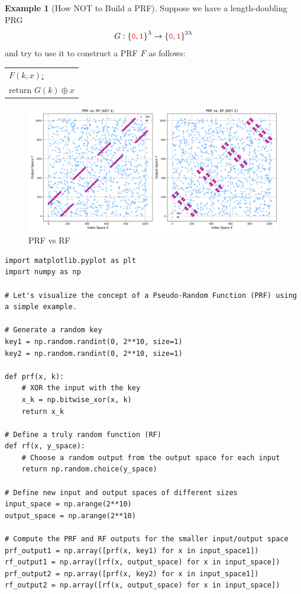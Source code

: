 \documentclass[12pt,openany]{book}
\theoremstyle{definition}
\newtheorem{example}{Example}[chapter]
\newcommand{\zero}{\textcolor{red}{\texttt{0}}}
\newcommand{\one}{\textcolor{red}{\texttt{1}}}
\newcommand{\tab}{\hspace{12pt}}
\newcommand{\xor}{\oplus}
\newcommand{\binaryfield}{\set{\zero,\one}}
\begin{document}
\begin{example}[How NOT to Build a PRF]
	Suppose we have a length-doubling PRG \[
	G:\binaryfield^{\lambda}\to\binaryfield^{2\lambda}
	\] and try to use it to construct a PRF $F$ as follows:
	\begin{table}[h!]\centering
		\begin{tabular}{|l|}
			\hline
			\underline{$F(k,x)$:}\\
			\tab return $G(k)\xor x$\\
			\hline
		\end{tabular}
	\end{table}
	\begin{figure}[h!]\centering
		\includegraphics[width=\textwidth, height=.36\textheight]{prf.png}
		\caption{PRF vs RF}
	\end{figure}
	\begin{lstlisting}[style=sage]
import matplotlib.pyplot as plt
import numpy as np

# Let's visualize the concept of a Pseudo-Random Function (PRF) using a simple example.

# Generate a random key
key1 = np.random.randint(0, 2**10, size=1)
key2 = np.random.randint(0, 2**10, size=1)

def prf(x, k):
	# XOR the input with the key
	x_k = np.bitwise_xor(x, k)
	return x_k

# Define a truly random function (RF)
def rf(x, y_space):
	# Choose a random output from the output space for each input
	return np.random.choice(y_space)

# Define new input and output spaces of different sizes
input_space = np.arange(2**10)
output_space = np.arange(2**10)

# Compute the PRF and RF outputs for the smaller input/output space
prf_output1 = np.array([prf(x, key1) for x in input_space1])
rf_output1 = np.array([rf(x, output_space) for x in input_space])
prf_output2 = np.array([prf(x, key2) for x in input_space1])
rf_output2 = np.array([rf(x, output_space) for x in input_space])


\end{lstlisting}
\end{example}
\end{document}
